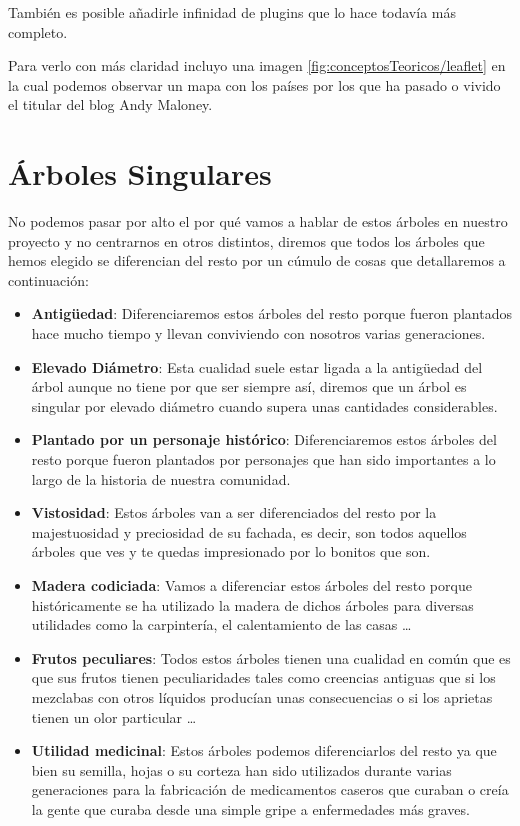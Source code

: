 También es posible añadirle infinidad de plugins que lo hace todavía más completo.

Para verlo con más claridad incluyo una imagen \ref{fig:conceptosTeoricos/leaflet} en la cual podemos observar un mapa con los países por los que ha pasado o vivido el titular del blog Andy Maloney.


\section{Árboles Singulares}

No podemos pasar por alto el por qué vamos a hablar de estos árboles en nuestro proyecto y no centrarnos en otros distintos, diremos que todos los árboles que hemos elegido se diferencian del resto por un cúmulo de cosas que detallaremos a continuación:

\begin{itemize}
	\item \textbf{Antigüedad}: Diferenciaremos estos árboles del resto porque fueron plantados hace mucho tiempo y llevan conviviendo con nosotros varias generaciones.  
	\item \textbf{Elevado Diámetro}: Esta cualidad suele estar ligada a la antigüedad del árbol aunque no tiene por que ser siempre así, diremos que un árbol es singular por elevado diámetro cuando supera unas cantidades considerables.
	\item \textbf{Plantado por un personaje histórico}: Diferenciaremos estos árboles del resto porque fueron plantados por personajes que han sido importantes a lo largo de la historia de nuestra comunidad.
	\item \textbf{Vistosidad}: Estos árboles van a ser diferenciados del resto por la majestuosidad y preciosidad de su fachada, es decir, son todos aquellos árboles que ves y te quedas impresionado por lo bonitos que son. 
	\item \textbf{Madera codiciada}: Vamos a diferenciar estos árboles del resto porque históricamente se ha utilizado la madera de dichos árboles para diversas utilidades como la carpintería, el calentamiento de las casas \ldots
	\item \textbf{Frutos peculiares}: Todos estos árboles tienen una cualidad en común que es que sus frutos tienen peculiaridades tales como creencias antiguas que si los mezclabas con otros líquidos producían unas consecuencias o si los aprietas tienen un olor particular \ldots
	\item \textbf{Utilidad medicinal}: Estos árboles podemos diferenciarlos del resto ya que bien su semilla, hojas o su corteza han sido utilizados durante varias generaciones para la fabricación de medicamentos caseros que curaban o creía la gente que curaba desde una simple gripe a enfermedades más graves.
\end{itemize}
